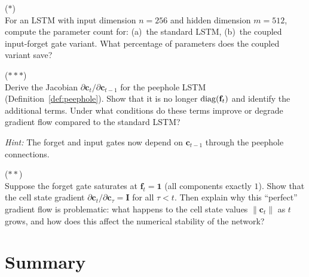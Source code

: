 \documentclass[11pt,a4paper]{article}
\begin{document}
\begin{exercise}
\textnormal{(\(\ast\))} \\
For an LSTM with input dimension $n = 256$ and hidden dimension
$m = 512$, compute the parameter count for: (a)~the standard LSTM,
(b)~the coupled input-forget gate variant.  What percentage of
parameters does the coupled variant save?
\end{exercise}

\begin{exercise}
\textnormal{(\(\ast\ast\ast\))} \\
Derive the Jacobian $\partial \mathbf{c}_t / \partial
\mathbf{c}_{t-1}$ for the peephole LSTM
(Definition~\ref{def:peephole}).  Show that it is no longer
$\operatorname{diag}(\mathbf{f}_t)$ and identify the additional terms.  Under
what conditions do these terms improve or degrade gradient flow
compared to the standard LSTM?

\textit{Hint:} The forget and input gates now depend on
$\mathbf{c}_{t-1}$ through the peephole connections.
\end{exercise}

\begin{exercise}
\textnormal{(\(\ast\ast\))} \\
Suppose the forget gate saturates at $\mathbf{f}_t = \mathbf{1}$
(all components exactly $1$).  Show that the cell state gradient
$\partial \mathbf{c}_t / \partial \mathbf{c}_\tau = \mathbf{I}$ for
all $\tau < t$.  Then explain why this ``perfect'' gradient flow
is problematic: what happens to the cell state values
$\|\mathbf{c}_t\|$ as $t$ grows, and how does this affect the
numerical stability of the network?
\end{exercise}

\section{Summary}
\label{sec:summary}
\end{document}
